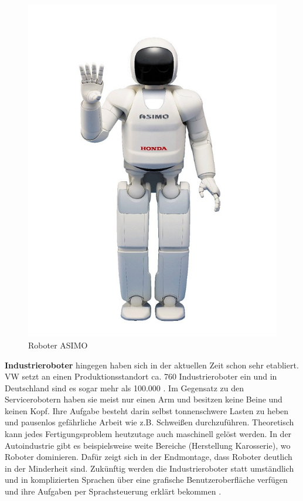 \begin{figure}[H]						
	\centering							
	\includegraphics[scale=0.5]{Bilder/asimo.jpg}			
	\caption{Roboter ASIMO}						
	\label{f:asimo}						
\end{figure}

\textbf{Industrieroboter} hingegen haben sich in der aktuellen Zeit schon sehr etabliert. VW setzt an einen Produktionsstandort ca. 760 Industrieroboter ein und in Deutschland sind es sogar mehr als 100.000 \cite{Haun2007}. Im Gegensatz zu den Servicerobotern haben sie meist nur einen Arm und besitzen keine Beine und keinen Kopf. Ihre Aufgabe besteht darin selbst tonnenschwere Lasten zu heben und pausenlos gefährliche Arbeit wie z.B. Schweißen durchzuführen. 
Theoretisch kann jedes Fertigungsproblem heutzutage auch maschinell gelöst werden. In der Autoindustrie gibt es beispielsweise weite Bereiche (Herstellung Karosserie), wo Roboter dominieren. Dafür zeigt sich in der Endmontage, dass Roboter deutlich in der Minderheit sind. Zukünftig werden die Industrieroboter statt umständlich und in komplizierten Sprachen über eine grafische Benutzeroberfläche verfügen und ihre Aufgaben per Sprachsteuerung erklärt bekommen \cite{Haun2007}.


